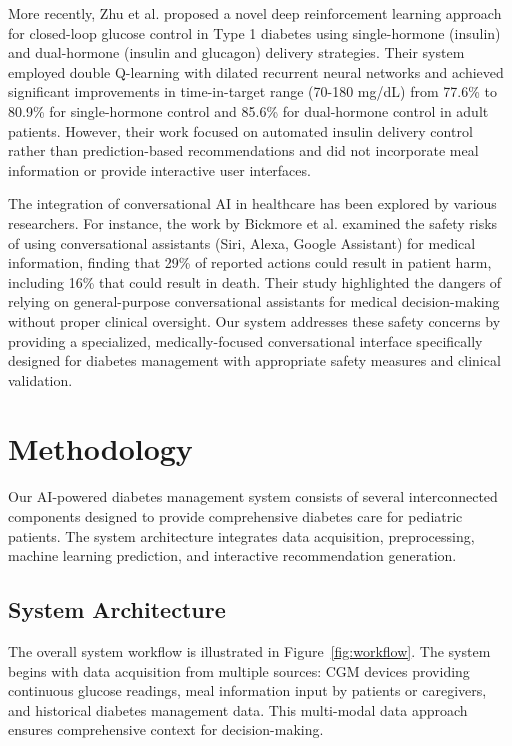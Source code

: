 \documentclass[acmsmall]{acmart}
\begin{document}
More recently, Zhu et al. \cite{Zhu2021} proposed a novel deep reinforcement learning approach for closed-loop glucose control in Type 1 diabetes using single-hormone (insulin) and dual-hormone (insulin and glucagon) delivery strategies. Their system employed double Q-learning with dilated recurrent neural networks and achieved significant improvements in time-in-target range (70-180 mg/dL) from 77.6\% to 80.9\% for single-hormone control and 85.6\% for dual-hormone control in adult patients. However, their work focused on automated insulin delivery control rather than prediction-based recommendations and did not incorporate meal information or provide interactive user interfaces.

The integration of conversational AI in healthcare has been explored by various researchers. For instance, the work by Bickmore et al. \cite{Bickmore2018} examined the safety risks of using conversational assistants (Siri, Alexa, Google Assistant) for medical information, finding that 29\% of reported actions could result in patient harm, including 16\% that could result in death. Their study highlighted the dangers of relying on general-purpose conversational assistants for medical decision-making without proper clinical oversight. Our system addresses these safety concerns by providing a specialized, medically-focused conversational interface specifically designed for diabetes management with appropriate safety measures and clinical validation.

\section{Methodology}

Our AI-powered diabetes management system consists of several interconnected components designed to provide comprehensive diabetes care for pediatric patients. The system architecture integrates data acquisition, preprocessing, machine learning prediction, and interactive recommendation generation.

\subsection{System Architecture}

The overall system workflow is illustrated in Figure~\ref{fig:workflow}. The system begins with data acquisition from multiple sources: CGM devices providing continuous glucose readings, meal information input by patients or caregivers, and historical diabetes management data. This multi-modal data approach ensures comprehensive context for decision-making.
\end{document}
